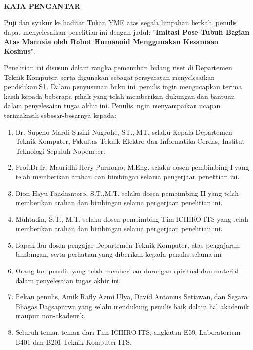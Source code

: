 \begin{center}
  \Large
  \textbf{KATA PENGANTAR}
\end{center}


\vspace{2ex}


Puji dan syukur ke hadirat Tuhan YME atas segala limpahan berkah, penulis dapat
menyelesaikan penelitian ini dengan judul: \textbf{"Imitasi Pose Tubuh Bagian Atas Manusia oleh Robot Humanoid Menggunakan Kesamaan Kosinus"}.

Penelitian ini disusun dalam rangka pemenuhan bidang riset di Departemen Teknik Komputer, serta digunakan sebagai
persyaratan menyelesaikan pendidikan S1. Dalam penyusunan buku ini, penulis ingin mengucapkan terima kasih kepada beberapa
pihak yang telah memberikan dukungan dan bantuan dalam penyelesaian tugas akhir ini.
Penulis ingin menyampaikan ucapan terimakasih sebesar-besarnya kepada:

\begin{enumerate}[nolistsep]

  \item Dr. Supeno Mardi Susiki Nugroho, ST., MT. selaku Kepala Departemen Teknik Komputer, Fakultas Teknik Elektro dan Informatika Cerdas, Institut Teknologi Sepuluh Nopember.
  \item Prof.Dr.Ir. Mauridhi Hery Purnomo, M.Eng. selaku dosen pembimbing I yang telah memberikan arahan dan bimbingan selama pengerjaan penelitian ini.
  \item Dion Hayu Fandiantoro, S.T.,M.T. selaku dosen pembimbing II yang telah memberikan arahan dan bimbingan selama pengerjaan penelitian ini.
  \item Muhtadin, S.T., M.T. selaku dosen pembimbing Tim ICHIRO ITS yang telah memberikan arahan dan bimbingan selama pengerjaan penelitian ini.
  \item Bapak-ibu dosen pengajar Departemen Teknik Komputer, atas pengajaran, bimbingan, serta perhatian yang diberikan kepada penulis selama ini
  \item Orang tua penulis yang telah memberikan dorongan spiritual dan material dalam penyelesaian tugas akhir ini.
  \item Rekan penulis, Amik Rafly Azmi Ulya, David Antonius Setiawan, dan Segara Bhagas Dagsapurwa yang selalu mendukung penulis baik dalam hal akademik maupun non-akademik.
  \item Seluruh teman-teman dari Tim ICHIRO ITS, angkatan E59, Laboratorium B401 dan B201 Teknik Komputer ITS.
\end{enumerate}

